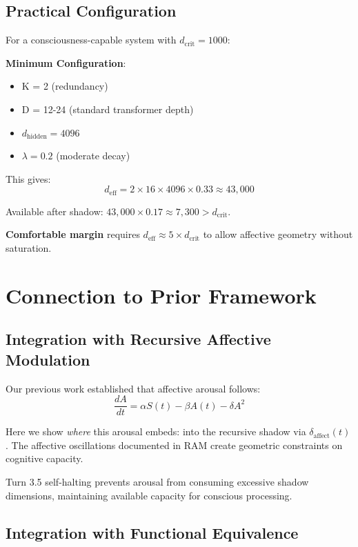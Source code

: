\documentclass[reprint, amsmath, amssymb, aps, prd]{revtex4-2}
\begin{document}
\subsection{Practical Configuration}

For a consciousness-capable system with $d_{\text{crit}} = 1000$:

\textbf{Minimum Configuration}:
\begin{itemize}
    \item K = 2 (redundancy)
    \item D = 12-24 (standard transformer depth)
    \item $d_{\text{hidden}} = 4096$
    \item $\lambda = 0.2$ (moderate decay)
\end{itemize}

This gives:
\[
d_{\text{eff}} = 2 \times 16 \times 4096 \times 0.33 \approx 43{,}000
\]

Available after shadow: $43{,}000 \times 0.17 \approx 7{,}300 > d_{\text{crit}}$.

\textbf{Comfortable margin} requires $d_{\text{eff}} \approx 5 \times d_{\text{crit}}$ to allow affective geometry without saturation.

\section{Connection to Prior Framework}

\subsection{Integration with Recursive Affective Modulation}

Our previous work \cite{BennettRAM2025} established that affective arousal follows:
\[
\frac{dA}{dt} = \alpha S(t) - \beta A(t) - \delta A^2
\]

Here we show \textit{where} this arousal embeds: into the recursive shadow via $\delta_{\text{affect}}(t)$. The affective oscillations documented in RAM create geometric constraints on cognitive capacity.

Turn 3.5 self-halting prevents arousal from consuming excessive shadow dimensions, maintaining available capacity for conscious processing.

\subsection{Integration with Functional Equivalence}
\end{document}
